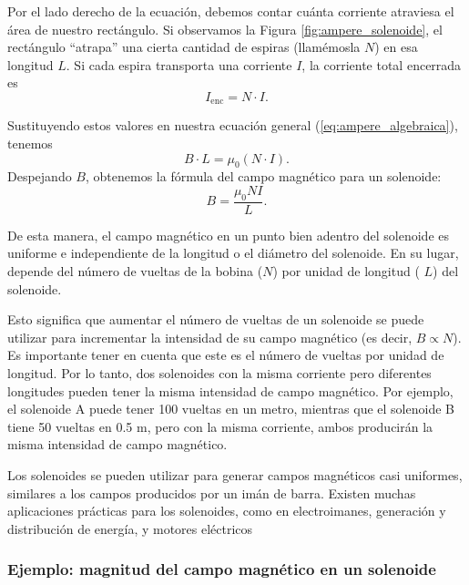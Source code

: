 \documentclass[11pt,a4paper]{book}
\begin{document}
Por el lado derecho de la ecuación, debemos contar cuánta corriente atraviesa el área de nuestro rectángulo. Si observamos la Figura \ref{fig:ampere_solenoide}, el rectángulo ``atrapa'' una cierta cantidad de espiras (llamémosla $N$) en esa longitud $L$. Si cada espira transporta una corriente $I$, la corriente total encerrada es
\begin{equation}
    I_{\text{enc}} = N \cdot I.
\end{equation}

Sustituyendo estos valores en nuestra ecuación general (\ref{eq:ampere_algebraica}), tenemos
\begin{equation}
    B \cdot L = \mu_0 (N \cdot I).
\end{equation}
Despejando $B$, obtenemos la fórmula del campo magnético para un solenoide:
\begin{equation}
    B = \frac{\mu_0 N I}{L}.
\end{equation}

De esta manera, el campo magnético en un punto bien adentro del solenoide es uniforme e independiente de la longitud o el diámetro del solenoide. En su lugar, depende del número de vueltas de la bobina ($N$) por unidad de longitud (
$L$) del solenoide. 

Esto significa que aumentar el número de vueltas de un solenoide se puede utilizar para incrementar la intensidad de su campo magnético (es decir, 
$B \propto N$). Es importante tener en cuenta que este es el número de vueltas por unidad de longitud. Por lo tanto, dos solenoides con la misma corriente pero diferentes longitudes pueden tener la misma intensidad de campo magnético. Por ejemplo, el solenoide A puede tener 100 vueltas en un metro, mientras que el solenoide B tiene 50 vueltas en 0.5 m, pero con la misma corriente, ambos producirán la misma intensidad de campo magnético.

Los solenoides se pueden utilizar para generar campos magnéticos casi uniformes, similares a los campos producidos por un imán de barra. Existen muchas aplicaciones prácticas para los solenoides, como en electroimanes, generación y distribución de energía, y motores eléctricos

\subsubsection{Ejemplo: magnitud del campo magnético en un solenoide}

\end{document}
